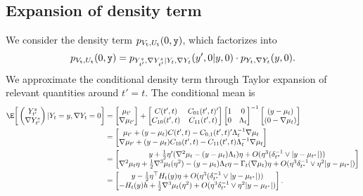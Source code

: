 \documentclass{article}
\begin{document}
	\subsection{Expansion of density term}
	We consider the density term $p_{V_{{\tt t}},U_{{\tt t}}}(0,{\tt y})$, which factorizes into
	\begin{equation*}
		p_{V_{{\tt t}},U_{{\tt t}}}(0,{\tt y}) = p_{Y_{t'}^s, \nabla Y_{t'}^s|Y_t,\nabla Y_t}(y',0|y,0) \cdot p_{Y_t,\nabla Y_t}(y,0).
	\end{equation*}
	We approximate the conditional density term through Taylor expansion of relevant quantities around $t' = t$. The conditional mean is
	\begin{align*}
		\E\bigg[
		\begin{pmatrix}
			Y_{t'}^s \\
			\nabla Y_{t'}^s
		\end{pmatrix}|Y_t = y, \nabla Y_t = 0\bigg] 
		& = 
		\begin{bmatrix}
			\mu_{t'} \\
			\nabla \mu_{t'}
		\end{bmatrix}
		+ 
		\begin{bmatrix}
			C(t',t) & C_{01}(t',t)' \\
			C_{10}(t',t) & C_{11}(t',t)
		\end{bmatrix}
		\begin{bmatrix}
			1 & 0 \\
			0 & \Lambda_{t}
		\end{bmatrix}^{-1}
		\begin{bmatrix}
			(y - \mu_t) \\
			(0 - \nabla \mu_t)
		\end{bmatrix} \\
		& = 
		\begin{bmatrix}
			\mu_{t'} + (y - \mu_t)C(t',t) - C_{0,1}(t',t)' \Lambda_t^{-1} \nabla\mu_t \\
			\nabla \mu_{t'} + (y - \mu_t)C_{10}(t',t) - C_{11}(t',t)\Lambda_{t}^{-1} \nabla \mu_t
		\end{bmatrix} \\
		& = 
		\begin{bmatrix}
			y + \frac{1}{2}\eta'(\nabla^2 \mu_t - (y - \mu_t)\Lambda_t) \eta + O(\eta^3(\delta_{t^*}^{-1} \vee |y  - \mu_{t^*}|)) \\
			\nabla^2 \mu_t \eta + \frac{1}{2}\nabla^3 \mu_t(\eta^2) - (y - \mu_t) \Lambda_t \eta - \Gamma_t(\nabla\mu_t) \eta + O(\eta^3 \delta_{t^*}^{-1} \vee \eta^2|y  - \mu_{t^*}|) 
		\end{bmatrix}
		\\
		& = 
		\begin{bmatrix}
			y - \frac{1}{2}\eta^{\top}H_t(y) \eta + O(\eta^3(\delta_{t^*}^{-1} \vee |y  - \mu_{t^*}|)) \\
			-H_t(y)h+ \frac{1}{2}\nabla^3 \mu_t(\eta^2) + O(\eta^3 \delta_{t^*}^{-1} \vee \eta^2|y  - \mu_{t^*}|) 
		\end{bmatrix}.
	\end{align*}
\end{document}
